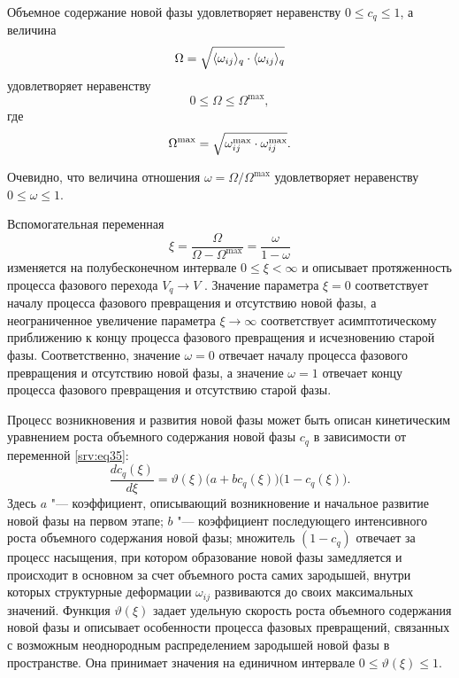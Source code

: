 Объемное содержание новой фазы удовлетворяет неравенству $0 \leq c_{q} \leq 1$, а величина 
\begin{equation}
\Omega=\sqrt{ \langle  {\omega_{ij}}  \rangle _{q}\cdot \langle  {\omega_{ij}}  \rangle _{q}\mathstrut}
\end{equation}
удовлетворяет неравенству
\begin{equation}
0 \leq \Omega \leq \Omega^{\max},
\end{equation}
где
\begin{equation}
\Omega^{\max}=\sqrt{\omega_{ij}^{\max}\cdot\omega_{ij}^{\max}\mathstrut}.
\end{equation}

Очевидно, что величина отношения $\omega= {\Omega}/{\Omega^{\max}}$  удовлетворяет неравенству $0 \leq \omega \leq 1$.

Вспомогательная переменная
\begin{equation}\label{srv:eq35}
\xi=\dfrac{\Omega}{\Omega-\Omega^{\max}}=\dfrac{\omega}{1-\omega}
\end{equation}
изменяется на полубесконечном интервале $0 \leq \xi < \infty$  и описывает протяженность процесса фазового перехода $V_{q} \to V$ . Значение параметра $\xi=0$  соответствует началу процесса фазового превращения и отсутствию новой фазы, а неограниченное увеличение параметра $\xi \to \infty$  соответствует асимптотическому приближению к концу процесса фазового превращения и исчезновению старой фазы. Соответственно, значение $\omega=0$  отвечает началу процесса фазового превращения и отсутствию новой фазы, а значение  $\omega=1$ отвечает концу процесса фазового превращения и отсутствию старой фазы.

Процесс возникновения и развития новой фазы может быть описан кинетическим уравнением роста объемного содержания новой фазы $c_{q}$ в зависимости от переменной \eqref{srv:eq35}:
\begin{equation}\label{srv:eq36}
\dfrac{d c_{q}(\xi)}{d \xi}=\vartheta(\xi)\big(a+b c_{q}(\xi)\big)\big(1-c_{q}(\xi)\big).
\end{equation}
Здесь $a$ "--- коэффициент, описывающий возникновение и начальное развитие новой фазы на первом этапе; $b$ "--- коэффициент последующего интенсивного роста объемного содержания новой фазы; множитель $(1-c_{q})$  отвечает за процесс насыщения, при котором образование новой фазы замедляется и происходит в основном за счет объемного роста самих зародышей, внутри которых структурные деформации $\omega_{ij}$  развиваются до своих максимальных значений. Функция $\vartheta(\xi)$  задает удельную скорость роста объемного содержания новой фазы и описывает особенности процесса фазовых превращений, связанных с возможным неоднородным распределением зародышей новой фазы в пространстве. Она принимает значения на единичном интервале $0 \leq \vartheta(\xi) \leq 1$.


